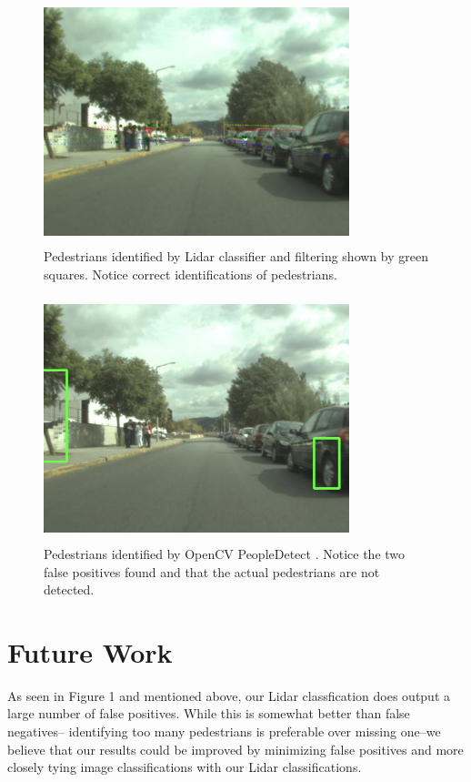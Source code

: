 \documentclass[10pt,twocolumn,letterpaper]{article}
\begin{document}
  \begin{figure}
    \includegraphics[height=2.8in, width=3.5in]{images/sample2lidar.png}
    \caption{ Pedestrians identified by Lidar classifier and filtering shown
    by green squares. Notice correct identifications of pedestrians. }
  \end{figure}

    \begin{figure}
    \includegraphics[height=2.8in, width=3.5in]{images/sample2cv.png}
    \caption{ Pedestrians identified by OpenCV PeopleDetect \cite{opencv}.
    Notice the two false positives found and that the actual pedestrians are
    not detected. }
  \end{figure}

\section{Future Work}
  As seen in Figure 1 and mentioned above, our Lidar classfication does output a
  large number of false positives. While this is somewhat better than false negatives--
  identifying too many pedestrians is preferable over missing one--we believe that
  our results could be improved by minimizing false positives and more closely
  tying image classifications with our Lidar classifications.
\end{document}

